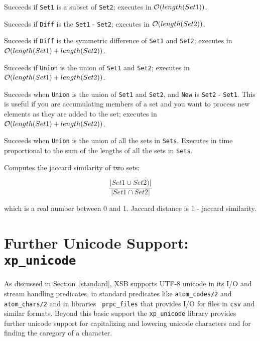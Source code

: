 \begin{description}
%
Succeeds if {\tt Set1} is a subset of {\tt Set2}; executes in
${\cal O}(length(Set1))$.

%
Succeeds if {\tt Diff} is the {\tt Set1} - {\tt Set2}; executes in
${\cal O}(length(Set2))$.

%
Succeeds if {\tt Diff} is the symmetric difference of {\tt Set1} and
{\tt Set2}; executes in ${\cal O}(length(Set1) + length(Set2))$.

%
Succeeds if {\tt Union} is the union of {\tt Set1} and {\tt Set2}; executes in
${\cal O}(length(Set1)+length(Set2))$.

%
Succeeds when {\tt Union} is the union of {\tt Set1} and {\tt Set2},
and {\tt New} is {\tt Set2} - {\tt Set1}.  This is useful if you are
accumulating members of a set and you want to process new elements as
they are added to the set; executes in ${\cal O}(length(Set1) + length(Set2))$.

%
Succeeds when {\tt Union} is the union of all the sets in {\tt Sets}. 
Executes in time proportional to the sum of the lengths
of all the sets in {\tt Sets}.

%
Computes the jaccard similarity of two sets:

\[ \frac{|Set1 \cup Set2)|}{|Set1 \cap Set2|}\]

which is a real number between 0 and 1.  Jaccard distance is 1 -
jaccard similarity.
\end{description}

\section{Further Unicode Support: {\tt xp\_unicode}}

As discussed in Section~\ref{standard}, XSB supports UTF-8 unicode in
its I/O and stream handling predicates, in standard predicates like
{\tt atom\_codes/2} and {\tt atom\_chars/2} and in libraries {\tt
  prpc\_files} that provides I/O for files in {\tt csv} and similar
formats.  Beyond this basic support the {\tt xp\_unicode} library
provides further unicode support for capitalizing and lowering unicode
characters and for finding the caregory of a character.

